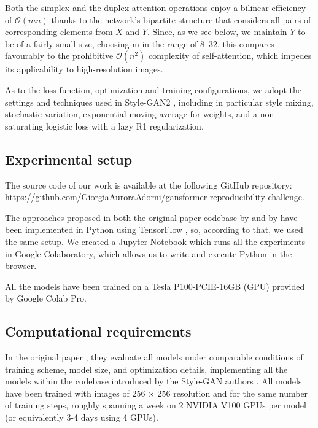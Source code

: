 \documentclass{article}
\begin{document}
	Both the simplex and the duplex attention operations enjoy a bilinear efficiency of 
	$\mathcal{O}(mn)$ thanks to the network’s bipartite structure that considers all pairs of 
	corresponding elements from $X$ and $Y$. Since, as we see below, we maintain $Y$ to be of a fairly 
	small size, choosing m in the range of 8–32, this compares favourably to the prohibitive 	
	$\mathcal{O}(n^2)$  complexity of self-attention, which impedes its applicability to high-resolution 
	images.
	
	As to the loss function, optimization and training configurations, we adopt the settings and 
	techniques used in Style-GAN2 \cite{karras2020analyzing}, including in particular style mixing, 
	stochastic variation, exponential moving average for weights, and a non-saturating logistic loss with 
	a lazy R1 regularization.
	
	\subsection{Experimental setup}	
	The source code of our work is available at the following GitHub repository: 
	\url{https://github.com/GiorgiaAuroraAdorni/gansformer-reproducibility-challenge}.
	 
	 The approaches proposed in both the original paper codebase by \citet{karras2020analyzing} and 
	 by \citet{hudson2021generative} have been implemented in Python using TensorFlow 
	 \cite{tensorflow2015-whitepaper}, so, according to that, we used the same setup.
	 We created a Jupyter Notebook which runs all the experiments in Google Colaboratory, which 
	 allows us to write and execute Python in the browser. %
	
	 All the models have been trained on a Tesla P100-PCIE-16GB (GPU) provided by Google 
	 Colab Pro.
	
	\subsection{Computational requirements}%
	In the original paper \cite{hudson2021generative}, they evaluate all models under comparable 
	conditions of training scheme, model size, and optimization details, implementing all the models 
	within the codebase introduced by the Style-GAN authors \cite{karras2020analyzing}. 
	All models have been trained with images of 256 × 256 resolution and for the 
	same number of training steps, roughly spanning a week on 2 NVIDIA V100 GPUs per model (or 
	equivalently 3-4 days using 4 GPUs). 
	
\end{document}
